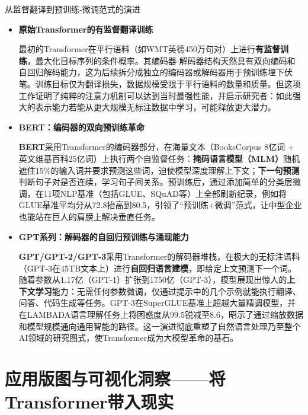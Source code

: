 \documentclass[11pt]{beamer}
\begin{document}
\begin{frame}{从监督翻译到预训练-微调范式的演进}
\begin{itemize}
    \item \textbf{原始Transformer的有监督翻译训练}
    
    最初的Transformer在平行语料（如WMT英德450万句对）上进行\textbf{有监督训练}，最大化目标序列的条件概率。其编码器-解码器结构天然具有双向编码和自回归解码能力，这为后续拆分成独立的编码器或解码器用于预训练埋下伏笔。训练目标仅为翻译损失，数据规模受限于平行语料的数量和质量。但这项工作证明了纯粹的注意力机制可以达到当时最强性能，并启示研究者：如此强大的表示能力若能从更大规模无标注数据中学习，可能释放更大潜力。

    \item \textbf{BERT：编码器的双向预训练革命}
    
    \textbf{BERT}采用Transformer的编码器部分，在海量文本（BooksCorpus 8亿词 + 英文维基百科25亿词）上执行两个自监督任务：\textbf{掩码语言模型（MLM）}随机遮住15\%的输入词并要求预测这些词，迫使模型深度理解上下文；\textbf{下一句预测}判断句子对是否连续，学习句子间关系。预训练后，通过添加简单的分类层微调，在11项NLP基准（包括GLUE、SQuAD等）上全部刷新纪录，例如将GLUE基准平均分从72.8抬高到80.5，引领了“\alert{预训练+微调}”范式，让中型企业也能站在巨人的肩膀上解决垂直任务。

    \item \textbf{GPT系列：解码器的自回归预训练与涌现能力}
    
    \textbf{GPT/GPT-2/GPT-3}采用Transformer的解码器堆栈，在极大的无标注语料（GPT-3在45TB文本上）进行\textbf{自回归语言建模}，即给定上文预测下一个词。随着参数从1.17亿（GPT-1）扩张到1750亿（GPT-3），模型展现出惊人的\textbf{上下文学习}能力：无需任何参数微调，仅通过提示中的几个示例就能执行翻译、问答、代码生成等任务。GPT-3在SuperGLUE基准上超越大量精调模型，并在LAMBADA语言理解任务上将困惑度从99.5锐减至8.6，昭示了通过缩放数据和模型规模通向通用智能的路径。这一演进彻底重塑了自然语言处理乃至整个AI领域的研究图式，使Transformer成为大模型革命的基石。
\end{itemize}
\end{frame}

\section{应用版图与可视化洞察——将Transformer带入现实}
\end{document}
